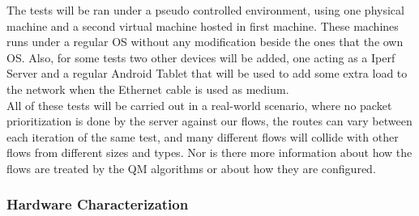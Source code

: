 The tests will be ran under a pseudo controlled environment, using one
physical  machine and a second virtual machine hosted in first machine. These
machines  runs under a regular OS without any modification beside the ones
that the  own OS. Also, for some tests two other devices will be added,  one
acting as a Iperf Server and a regular Android Tablet that will be used to
add some extra load to the network when the Ethernet cable is used as medium.\\

All of these tests will be carried out in a real-world scenario, where no
packet  prioritization is done by the server against our flows, the routes can
vary between each iteration of the same test, and many different flows will
collide with other flows from different sizes and types. Nor is there more
information  about how the flows are treated by the QM algorithms or about how
they are  configured.\\

\subsubsection{Hardware Characterization}

